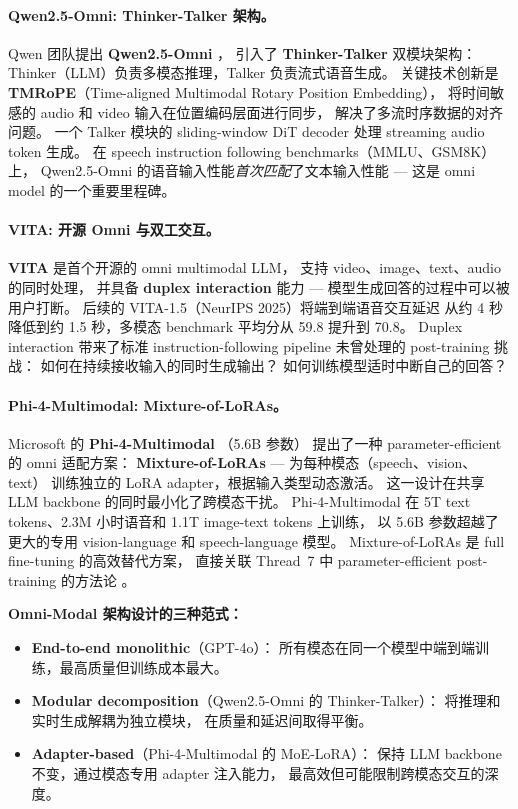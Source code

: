 \paragraph{Qwen2.5-Omni: Thinker-Talker 架构。}
Qwen 团队提出 \textbf{Qwen2.5-Omni} \cite{xu2025qwen25omni}，
引入了 \textbf{Thinker-Talker} 双模块架构：
Thinker（LLM）负责多模态推理，Talker 负责流式语音生成。
关键技术创新是 \textbf{TMRoPE}（Time-aligned Multimodal Rotary Position Embedding），
将时间敏感的 audio 和 video 输入在位置编码层面进行同步，
解决了多流时序数据的对齐问题。
一个 Talker 模块的 sliding-window DiT decoder 处理 streaming audio token 生成。
在 speech instruction following benchmarks（MMLU、GSM8K）上，
Qwen2.5-Omni 的语音输入性能\textit{首次匹配}了文本输入性能 ---
这是 omni model 的一个重要里程碑。

\paragraph{VITA: 开源 Omni 与双工交互。}
\textbf{VITA} \cite{fu2024vita} 是首个开源的 omni multimodal LLM，
支持 video、image、text、audio 的同时处理，
并具备 \textbf{duplex interaction} 能力 --- 模型生成回答的过程中可以被用户打断。
后续的 VITA-1.5（NeurIPS 2025）将端到端语音交互延迟
从约 4 秒降低到约 1.5 秒，多模态 benchmark 平均分从 59.8 提升到 70.8。
Duplex interaction 带来了标准 instruction-following pipeline
未曾处理的 post-training 挑战：
如何在持续接收输入的同时生成输出？
如何训练模型适时中断自己的回答？

\paragraph{Phi-4-Multimodal: Mixture-of-LoRAs。}
Microsoft 的 \textbf{Phi-4-Multimodal} \cite{abouelenin2025phi4mini}（5.6B 参数）
提出了一种 parameter-efficient 的 omni 适配方案：
\textbf{Mixture-of-LoRAs} --- 为每种模态（speech、vision、text）
训练独立的 LoRA adapter，根据输入类型动态激活。
这一设计在共享 LLM backbone 的同时最小化了跨模态干扰。
Phi-4-Multimodal 在 5T text tokens、2.3M 小时语音和 1.1T image-text tokens 上训练，
以 5.6B 参数超越了更大的专用 vision-language 和 speech-language 模型。
Mixture-of-LoRAs 是 full fine-tuning 的高效替代方案，
直接关联 Thread~7 中 parameter-efficient post-training 的方法论
。

\begin{solutionbox}
\textbf{Omni-Modal 架构设计的三种范式：}
\begin{itemize}[leftmargin=2em]
  \item \textbf{End-to-end monolithic}（GPT-4o）：
    所有模态在同一个模型中端到端训练，最高质量但训练成本最大。
  \item \textbf{Modular decomposition}（Qwen2.5-Omni 的 Thinker-Talker）：
    将推理和实时生成解耦为独立模块，
    在质量和延迟间取得平衡。
  \item \textbf{Adapter-based}（Phi-4-Multimodal 的 MoE-LoRA）：
    保持 LLM backbone 不变，通过模态专用 adapter 注入能力，
    最高效但可能限制跨模态交互的深度。
\end{itemize}
\end{solutionbox}

